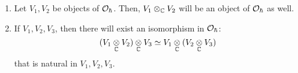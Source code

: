         \begin{proposition}
            \begin{enumerate}
                \item Let $V_1, V_2$ be objects of $\mathcal{O}_{\hbar}$. Then, $V_1 \tensor_{\bbC} V_2$ will be an object of $\mathcal{O}_{\hbar}$ as well.
                \item If $V_1, V_2, V_3$, then there will exist an isomorphism in $\mathcal{O}_{\hbar}$:
                    $$(V_1 \tensor_{\bbC} V_2) \tensor_{\bbC} V_3 \cong V_1 \tensor_{\bbC} (V_2 \tensor_{\bbC} V_3)$$
                that is natural in $V_1, V_2, V_3$.
            \end{enumerate}  
        \end{proposition}